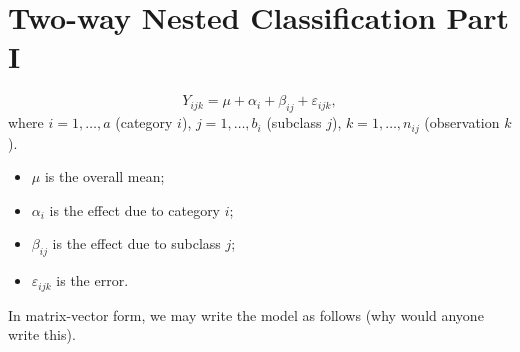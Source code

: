 \section*{Two-way Nested Classification Part I}
\[ Y_{ijk}=\mu+\alpha_i+\beta_{ij}+\varepsilon_{ijk}, \]
where $ i=1,\ldots,a $ (category $ i $), $ j=1,\ldots,b_i $ (subclass $ j $),
$ k=1,\ldots,n_{ij} $ (observation $ k $).
\begin{itemize}
    \item $ \mu $ is the overall mean;
    \item $ \alpha_i $ is the effect due to category $ i $;
    \item $ \beta_{ij} $ is the effect due to subclass $ j $;
    \item $ \varepsilon_{ijk} $ is the error.
\end{itemize}
In matrix-vector form, we may write the model as follows (why would anyone write this).
